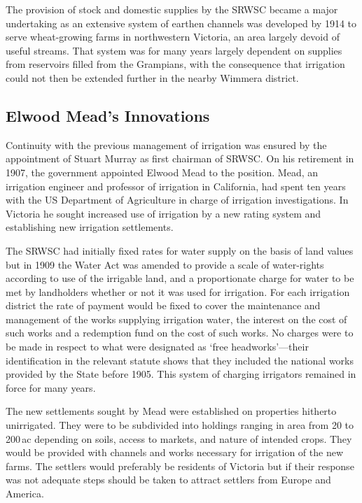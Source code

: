 The provision of stock and domestic supplies by the SRWSC became a
major undertaking as an extensive system of earthen channels was
developed by 1914 to serve wheat-growing farms in northwestern
Victoria, an area largely devoid of useful streams.  That system was for many years largely dependent on
supplies from reservoirs filled from the Grampians, with the
consequence that irrigation could not then be extended further in the
nearby Wimmera district.

\subsection*{Elwood Mead's Innovations}

Continuity with the previous management of irrigation was ensured by
the appointment of Stuart Murray as first chairman of SRWSC.  On his
retirement in 1907, the government appointed Elwood Mead to the
position.  Mead, an irrigation engineer and professor of irrigation in
California, had spent ten years with the US Department of Agriculture
in charge of irrigation investigations.  In Victoria he sought
increased use of irrigation by a new rating system and establishing
new irrigation settlements.

The SRWSC had initially fixed rates for water supply on the basis of
land values but in 1909 the Water Act was amended to provide a scale
of water-rights according to use of the irrigable land, and a
proportionate charge for water to be met by landholders whether or not
it was used for irrigation.  For each irrigation district the rate of
payment would be fixed to cover the maintenance and management of the
works supplying irrigation water, the interest on the cost of such
works and a redemption fund on the cost of such works.  No charges
were to be made in respect to what were designated as `free
headworks'---their identification in the relevant statute shows that
they included the national works provided by the State before
1905.  This system of
charging irrigators remained in force for many years.

The new settlements sought by Mead were established on properties
hitherto unirrigated. They were to be subdivided into holdings ranging
in area from 20 to 200\,ac depending on soils, access to markets, and
nature of intended crops.  They would be provided with channels and
works necessary for irrigation of the new farms.  The settlers would
preferably be residents of Victoria but if their response was not
adequate steps should be taken to attract settlers from Europe and
America.

